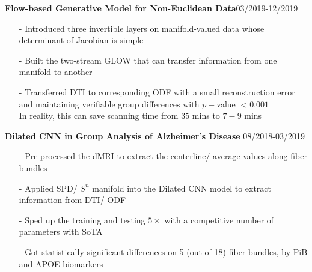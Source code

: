 \documentclass[margin]{res}
\begin{document}
\begin{resume}
                \textbf{Flow-based Generative Model for Non-Euclidean Data}\hfill 03/2019-12/2019
                \begin{itemize}\itemsep -2.2pt %
                 \item[-] Introduced three invertible layers on manifold-valued data whose determinant of Jacobian is simple
                 \item[-] Built the two-stream GLOW that can transfer information from one manifold to another
                 \item[-] Transferred DTI to corresponding ODF with a small reconstruction error and maintaining verifiable group differences with $p-$value $<0.001$\\ 
                 In reality, this can save scanning time from $35$ mins to $7-9$ mins
                 \end{itemize}


                \textbf{Dilated CNN in Group Analysis of Alzheimer's Disease} \hfill 08/2018-03/2019
                \begin{itemize}\itemsep -2.2pt %
                 \item[-] Pre-processed the dMRI to extract the centerline/ average values along fiber bundles
                 \item[-] Applied SPD/ $S^n$ manifold into the Dilated CNN model to extract information from DTI/ ODF
                 \item[-] Sped up the training and testing $5\times$ with a competitive number of parameters with SoTA
                 \item[-] Got statistically significant differences on 5 (out of 18) fiber bundles, by PiB and APOE biomarkers
                 \end{itemize}


\end{resume}
\end{document}
